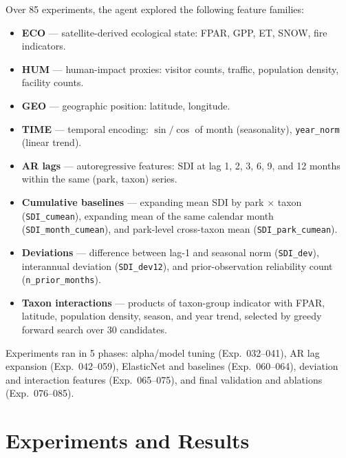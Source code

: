 \documentclass{article}
\begin{document}
Over 85 experiments, the agent explored the following feature families:

\begin{itemize}
  \item \textbf{ECO} --- satellite-derived ecological state: FPAR,
    GPP, ET, SNOW, fire indicators.
  \item \textbf{HUM} --- human-impact proxies: visitor counts,
    traffic, population density, facility counts.
  \item \textbf{GEO} --- geographic position: latitude, longitude.
  \item \textbf{TIME} --- temporal encoding: $\sin/\cos$ of month
    (seasonality), \texttt{year\_norm} (linear trend).
  \item \textbf{AR lags} --- autoregressive features: SDI at lag
    1, 2, 3, 6, 9, and 12 months within the same (park, taxon) series.
  \item \textbf{Cumulative baselines} --- expanding mean SDI by park
    $\times$ taxon (\texttt{SDI\_cumean}), expanding mean of the same
    calendar month (\texttt{SDI\_month\_cumean}), and park-level
    cross-taxon mean (\texttt{SDI\_park\_cumean}).
  \item \textbf{Deviations} --- difference between lag-1 and seasonal
    norm (\texttt{SDI\_dev}), interannual deviation (\texttt{SDI\_dev12}),
    and prior-observation reliability count (\texttt{n\_prior\_months}).
  \item \textbf{Taxon interactions} --- products of taxon-group
    indicator with FPAR, latitude, population density, season, and
    year trend, selected by greedy forward search over 30 candidates.
\end{itemize}

Experiments ran in 5 phases: alpha/model tuning (Exp.\ 032--041),
AR lag expansion (Exp.\ 042--059), ElasticNet and baselines
(Exp.\ 060--064), deviation and interaction features (Exp.\ 065--075),
and final validation and ablations (Exp.\ 076--085).

\section{Experiments and Results}
\label{sec:results}
\end{document}
